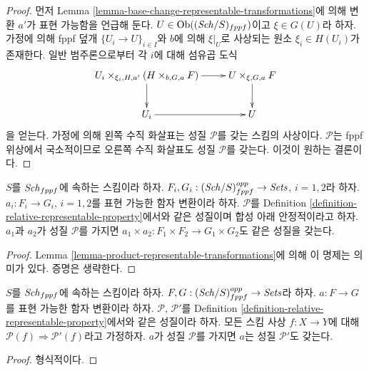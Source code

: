 \begin{proof}
먼저 Lemma \ref{lemma-base-change-representable-transformations}에 의해
변환 $a'$가 표현 가능함을 언급해 둔다.
$U \in \mathop{\mathrm{Ob}}\nolimits((\mathit{Sch}/S)_{fppf})$이고 $\xi \in G(U)$라 하자.
가정에 의해 fppf 덮개 $\{U_i \to U\}_{i \in I}$와
$b$에 의해 $\xi|_U$로 사상되는 원소 $\xi_i \in H(U_i)$가 존재한다.
일반 범주론으로부터 각 $i$에 대해 섬유곱 도식
$$
\xymatrix{
U_i \times_{\xi_i, H, a'} (H \times_{b, G, a} F) \ar[r] \ar[d] &
U \times_{\xi, G, a} F \ar[d] \\
U_i \ar[r] & U
}
$$
을 얻는다. 가정에 의해 왼쪽 수직 화살표는 성질 $\mathcal{P}$를 갖는
스킴의 사상이다. $\mathcal{P}$는 fppf 위상에서 국소적이므로 오른쪽
수직 화살표도 성질 $\mathcal{P}$를 갖는다. 이것이 원하는 결론이다.
\end{proof}

\begin{lemma}
\label{lemma-product-representable-transformations-property}
$S$를 $\mathit{Sch}_{fppf}$에 속하는 스킴이라 하자.
$F_i, G_i : (\mathit{Sch}/S)_{fppf}^{opp} \to \textit{Sets}$,
$i = 1, 2$라 하자. $a_i : F_i \to G_i$, $i = 1, 2$를 표현 가능한
함자 변환이라 하자. $\mathcal{P}$를 Definition
\ref{definition-relative-representable-property}에서와 같은 성질이며
합성 아래 안정적이라고 하자. $a_1$과 $a_2$가 성질 $\mathcal{P}$를 가지면
$a_1 \times a_2 : F_1 \times F_2 \longrightarrow G_1 \times G_2$도
같은 성질을 갖는다.
\end{lemma}

\begin{proof}
Lemma \ref{lemma-product-representable-transformations}에 의해 이 명제는
의미가 있다. 증명은 생략한다.
\end{proof}

\begin{lemma}
\label{lemma-representable-transformations-property-implication}
$S$를 $\mathit{Sch}_{fppf}$에 속하는 스킴이라 하자.
$F, G : (\mathit{Sch}/S)_{fppf}^{opp} \to \textit{Sets}$라 하자.
$a : F \to G$를 표현 가능한 함자 변환이라 하자.
$\mathcal{P}$, $\mathcal{P}'$를 Definition
\ref{definition-relative-representable-property}에서와 같은 성질이라
하자. 모든 스킴 사상 $f : X \to Y$에 대해
$\mathcal{P}(f) \Rightarrow \mathcal{P}'(f)$라고 가정하자.
$a$가 성질 $\mathcal{P}$를 가지면 $a$는 성질 $\mathcal{P}'$도 갖는다.
\end{lemma}

\begin{proof}
형식적이다.
\end{proof}

